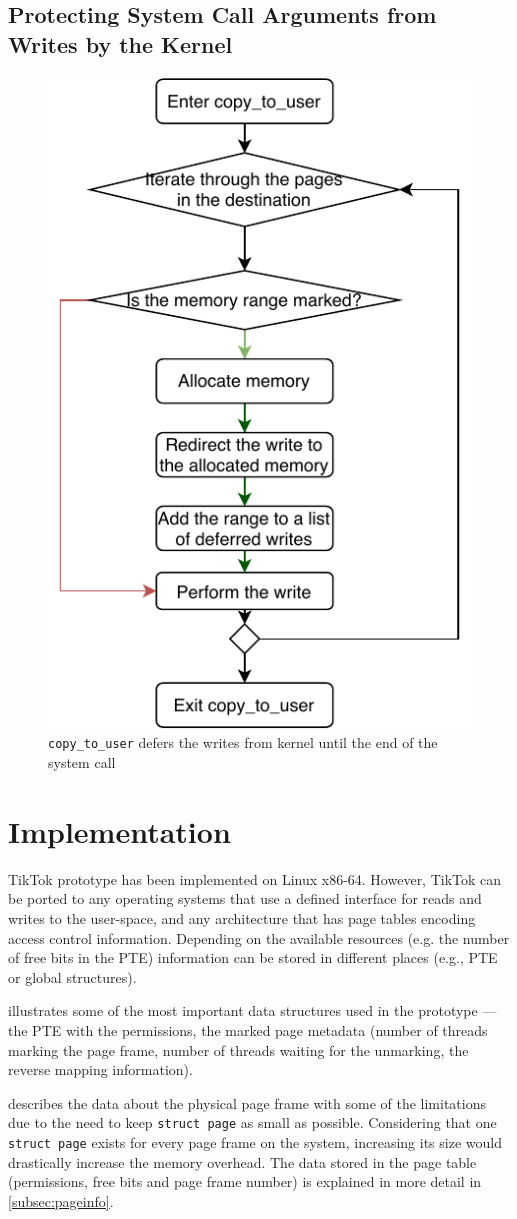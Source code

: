 \subsection{Protecting System Call Arguments from Writes by the Kernel}
\label{subsec:kernelland}
\begin{figure}[]
  \centering
  \includegraphics[width = .30 \textwidth]{img/copy_to_user.pdf}
  \caption{\texttt{copy\_to\_user} defers the writes from kernel until the end
  of the system call}
  \label{fig:copytouser}
\end{figure}


\section{Implementation}
\label{sec:implementation}

TikTok prototype has been implemented on Linux x86-64. However, TikTok can be
ported to any operating systems that use a defined interface for reads and
writes to the user-space, and any architecture that has page tables
encoding access control information. Depending on the available resources
(e.g. the number of free bits in the PTE)
information can be stored in different places (e.g., PTE or global structures).

 illustrates some of the most important data structures
used in the prototype --- the PTE with the permissions, the marked page metadata
(number of threads marking the page frame, number of threads waiting for the
unmarking, the reverse mapping information).

 describes the data about the
physical page frame with some of the limitations due to the need to keep
\texttt{struct page} as small as possible. Considering that one \texttt{struct
page} exists for every page frame on the system, increasing its size would
drastically increase the memory overhead.  The data stored in the page table
(permissions, free bits and page frame number) is explained in more detail in
\cref{subsec:pageinfo}.


